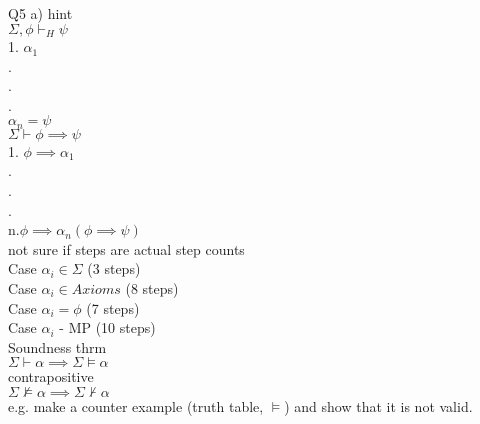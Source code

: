 \documentclass[12pt,oneside,notitlepage]{book}
\theoremstyle{definition}
\begin{document}
Q5 a) hint \\
$\Sigma , \phi \vdash_H \psi$ \\
1. $\alpha_1$ \\
 . \\
 . \\
 . \\
$ \alpha_n = \psi$ \\
$ \Sigma \vdash \phi \implies \psi$ \\
 1. $\phi \implies \alpha_1$ \\
  . \\
  . \\
  . \\
 n.$ \phi \implies \alpha_n (\phi \implies \psi)$ \\
 not sure if steps are actual step counts \\
 Case $\alpha_i \in \Sigma$ (3 steps) \\
 Case $\alpha_i \in Axioms$ (8 steps) \\
 Case $\alpha_i = \phi$ (7 steps) \\
 Case $\alpha_i$ - MP (10 steps) \\
Soundness thrm \\

$\Sigma \vdash \alpha \implies \Sigma \vDash \alpha $\\
contrapositive  \\
$\Sigma \not \vDash \alpha \implies \Sigma \not \vdash \alpha$ \\
e.g. make a counter example (truth table, $\vDash$) and show that it is not valid. \\
\end{document}
